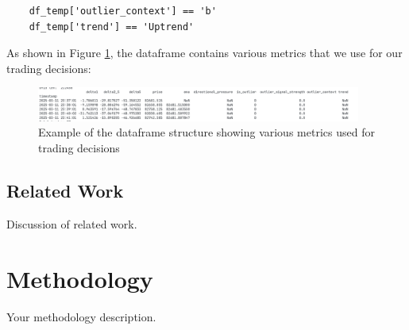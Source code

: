 \documentclass[12pt]{article}
\begin{document}
\begin{verbatim}
    df_temp['outlier_context'] == 'b'
    df_temp['trend'] == 'Uptrend'
\end{verbatim}

As shown in Figure \ref{fig:outlier_context}, the dataframe contains various metrics that we use for our trading decisions:

\begin{figure}[h]
    \centering
    \includegraphics[width=0.95\textwidth]{imgs/dataframeHead.png}
    \caption{Example of the dataframe structure showing various metrics used for trading decisions}
    \label{fig:outlier_context}
\end{figure}



\newpage
\subsection{Related Work}
Discussion of related work.


\newpage
\section{Methodology}
Your methodology description.



\newpage
\end{document}
